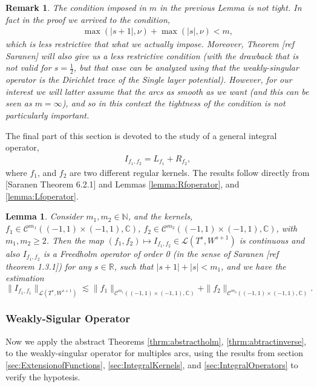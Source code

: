 \documentclass{article}
\newtheorem{lemma}[theorem]{Lemma}
\newtheorem{remark}[theorem]{Remark}
\newcommand{\todo}[1]{{\color{red}[#1]}}
\newcommand{\IC}{{\mathbb C}}
\newcommand{\IN}{{\mathbb N}}
\newcommand{\IR}{{\mathbb R}}
\newcommand{\cmspace}[3]{\mathcal{C}^{#1} \left( #2, #3 \right)}
\newcommand{\iinterv}{(-1,1)\times(-1,1)}
\begin{document}
\begin{remark}
The condition imposed in $m$ in the previous Lemma is not tight. In fact in the proof we arrived to the condition,
\begin{align*}
\max(|s+1|, \nu ) +\max(|s|, \nu )  < m ,
\end{align*}
which is less restrictive that what we actually impose. Moreover, Theorem \todo{ref Saranen} will also give us a less restrictive condition (with the drawback that is not valid for $s = \frac{1}{2}$, but that case can be analyzed using that the weakly-singular operator is the Dirichlet trace of the Single layer potential). However, for our interest we will latter assume that the arcs as smooth as we want (and this can be seen as $m=\infty$), and so in this context the tightness of the condition is not particularly important.  
\end{remark} 
The final part of this section is devoted to the study of a general integral operator, 
\begin{align}
\label{eq:Ioperator}
I_{f_1,f_2} = L_{f_1} +R_{f_2},\end{align}
where $f_1$, and $f_2$ are two different regular kernels. The results follow directly from \todo{Saranen Theorem 6.2.1} and Lemmas \ref{lemma:Rfoperator}, and \ref{lemma:Lfoperator}.

\begin{lemma}
\label{lemma:IOperator}
Consider $m_1, m_2 \in \IN$, and the kernels, $f_1 \in \cmspace{m_1}{\iinterv}{\IC}$, $f_2 \in \cmspace{m_2}{\iinterv}{\IC}$, with $m_1, m_2 \geq 2$. Then the map $(f_1, f_2) \mapsto I_{f_1,f_2} \in \mathcal{L}(T^s, W^{s+1})$ is continuous and also $I_{f_1,f_2}$ is a Freedholm operator of order 0 (in the sense of Saranen \todo{ref theorem 1.3.1}) for any $s\in \IR$, such that $|s+1|+|s| < m_1$, and we have the estimation
$$
\|I_{f_1,f_1}\|_{\mathcal{L}(T^s, W^{s+1})} \lesssim \|f_1\|_{\cmspace{m_1}{\iinterv}{\IC}} + \|f_2\|_{\cmspace{m_2}{\iinterv}{\IC}}.
$$
 \end{lemma}

\subsubsection{Weakly-Sigular Operator}

Now we apply the abstract Theorems \ref{thrm:abstractholm}, \ref{thrm:abtractinverse}, to the weakly-singular operator for multiples arcs, using the results from section \ref{sec:ExtensionofFunctions}, \ref{sec:IntegralKernels}, and \ref{sec:IntegralOperators} to verify the hypotesis. 
\end{document}

